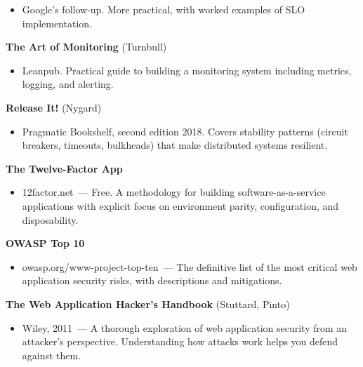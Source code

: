\begin{itemize}
\tightlist
\item
  Google's follow-up. More practical, with worked examples of SLO implementation.
\end{itemize}

\noindent{}\textbf{The Art of Monitoring} (Turnbull)

\begin{itemize}
\tightlist
\item
  Leanpub. Practical guide to building a monitoring system including metrics, logging, and alerting.
\end{itemize}

\noindent{}\textbf{Release It!} (Nygard)

\begin{itemize}
\tightlist
\item
  Pragmatic Bookshelf, second edition 2018. Covers stability patterns (circuit breakers, timeouts, bulkheads) that make distributed systems resilient.
\end{itemize}

\noindent{}\textbf{The Twelve-Factor App}

\begin{itemize}
\tightlist
\item
  12factor.net~--- Free. A methodology for building software-as-a-service applications with explicit focus on environment parity, configuration, and disposability.
\end{itemize}

\label{44-appendices:d5-security}

\textbf{OWASP Top 10}

\begin{itemize}
\tightlist
\item
  owasp.org/www-project-top-ten~--- The definitive list of the most critical web application security risks, with descriptions and mitigations.
\end{itemize}

\noindent{}\textbf{The Web Application Hacker's Handbook} (Stuttard, Pinto)

\begin{itemize}
\tightlist
\item
  Wiley, 2011~--- A thorough exploration of web application security from an attacker's perspective. Understanding how attacks work helps you defend against them.
\end{itemize}


